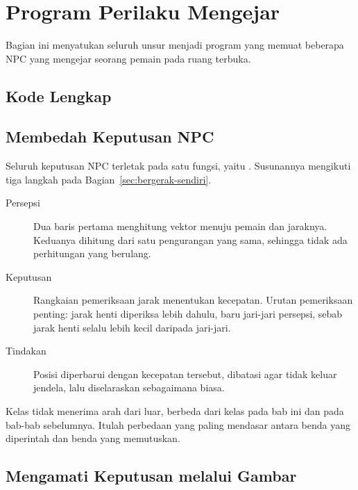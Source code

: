 \section{Program Perilaku Mengejar}
\label{sec:program-chase}

Bagian ini menyatukan seluruh unsur menjadi program yang memuat beberapa NPC
yang mengejar seorang pemain pada ruang terbuka.

\subsection{Kode Lengkap}


\subsection{Membedah Keputusan NPC}

Seluruh keputusan NPC terletak pada satu fungsi, yaitu .
Susunannya mengikuti tiga langkah pada Bagian~\ref{sec:bergerak-sendiri}.

\begin{description}
  \item[Persepsi] Dua baris pertama menghitung vektor menuju pemain dan
        jaraknya. Keduanya dihitung dari satu pengurangan yang
        sama, sehingga tidak ada perhitungan yang berulang.
  \item[Keputusan] Rangkaian pemeriksaan jarak menentukan kecepatan. Urutan
        pemeriksaan penting: jarak henti diperiksa lebih dahulu, baru jari-jari
        persepsi, sebab jarak henti selalu lebih kecil daripada jari-jari.
  \item[Tindakan] Posisi diperbarui dengan kecepatan tersebut, dibatasi agar
        tidak keluar jendela, lalu  diselaraskan sebagaimana biasa.
\end{description}

Kelas  tidak menerima arah dari luar, berbeda dari
kelas  pada bab ini dan pada bab-bab sebelumnya. Itulah perbedaan
yang paling mendasar antara benda yang diperintah dan benda yang memutuskan.

\subsection{Mengamati Keputusan melalui Gambar}

